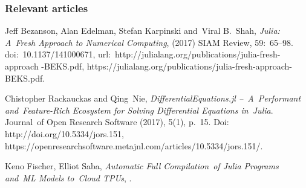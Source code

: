 \documentclass[10pt,t]{beamer}
\begin{document}
\begin{frame}
  \frametitle{Relevant articles}


  Jeff Bezanson, Alan Edelman, Stefan Karpinski and~Viral
  B.~Shah, \textit{Julia: A~Fresh Approach to Numerical Computing},
  (2017) SIAM Review, 59:~65--98. doi:~10.1137/141000671,
  url:~http://julialang.org/publications/julia-fresh-approach
  -BEKS.pdf,
  {https://julialang.org/publications/julia-fresh-approach-BEKS.pdf}.

  Chistopher Rackauckas and Qing~Nie,
  \textit{DifferentialEquations.jl --~A~Performant and~Feature-Rich
    Ecosystem for Solving Differential Equations in~Julia}.
  Journal~of Open Research Software (2017), 5(1), p.~15. Doi:
  http://doi.org/10.5334/jors.151,
  {https://openresearchsoftware.metajnl.com/articles/10.5334/jors.151/}.

  Keno Fischer, Elliot Saba, \textit{Automatic Full Compilation~of
    Julia Programs and~ML Models to~Cloud TPUs},
  .

\end{frame}
\end{document}
